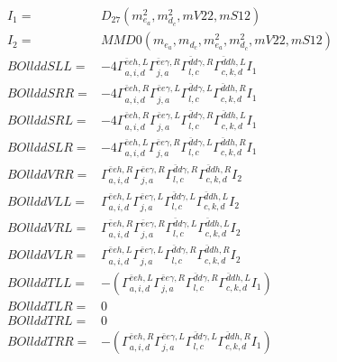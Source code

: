 \documentclass[A4,landscape]{article}
\begin{document}
\begin{align} 
I_1 = & D_{27}(m^2_{e_{{a}}}, m^2_{d_{{c}}}, mV22, mS12) \\ 
I_2 = & MMD0(m_{e_{{a}}}, m_{d_{{c}}}, m^2_{e_{{a}}}, m^2_{d_{{c}}}, mV22, mS12) \\ 
  BOllddSLL= & -4  \Gamma^{\bar{e}e h ,L}_{a, i, d} \Gamma^{\bar{e}e \gamma ,R}_{j, a} \Gamma^{\bar{d}d \gamma ,R}_{l, c} \Gamma^{\bar{d}d h ,L}_{c, k, d} I_1 \\ 
  BOllddSRR= & -4  \Gamma^{\bar{e}e h ,R}_{a, i, d} \Gamma^{\bar{e}e \gamma ,L}_{j, a} \Gamma^{\bar{d}d \gamma ,L}_{l, c} \Gamma^{\bar{d}d h ,R}_{c, k, d} I_1 \\ 
  BOllddSRL= & -4  \Gamma^{\bar{e}e h ,R}_{a, i, d} \Gamma^{\bar{e}e \gamma ,L}_{j, a} \Gamma^{\bar{d}d \gamma ,R}_{l, c} \Gamma^{\bar{d}d h ,L}_{c, k, d} I_1 \\ 
  BOllddSLR= & -4  \Gamma^{\bar{e}e h ,L}_{a, i, d} \Gamma^{\bar{e}e \gamma ,R}_{j, a} \Gamma^{\bar{d}d \gamma ,L}_{l, c} \Gamma^{\bar{d}d h ,R}_{c, k, d} I_1 \\ 
  BOllddVRR= &  \Gamma^{\bar{e}e h ,R}_{a, i, d} \Gamma^{\bar{e}e \gamma ,R}_{j, a} \Gamma^{\bar{d}d \gamma ,R}_{l, c} \Gamma^{\bar{d}d h ,R}_{c, k, d} I_2 \\ 
  BOllddVLL= &  \Gamma^{\bar{e}e h ,L}_{a, i, d} \Gamma^{\bar{e}e \gamma ,L}_{j, a} \Gamma^{\bar{d}d \gamma ,L}_{l, c} \Gamma^{\bar{d}d h ,L}_{c, k, d} I_2 \\ 
  BOllddVRL= &  \Gamma^{\bar{e}e h ,R}_{a, i, d} \Gamma^{\bar{e}e \gamma ,R}_{j, a} \Gamma^{\bar{d}d \gamma ,L}_{l, c} \Gamma^{\bar{d}d h ,L}_{c, k, d} I_2 \\ 
  BOllddVLR= &  \Gamma^{\bar{e}e h ,L}_{a, i, d} \Gamma^{\bar{e}e \gamma ,L}_{j, a} \Gamma^{\bar{d}d \gamma ,R}_{l, c} \Gamma^{\bar{d}d h ,R}_{c, k, d} I_2 \\ 
  BOllddTLL= & -( \Gamma^{\bar{e}e h ,L}_{a, i, d} \Gamma^{\bar{e}e \gamma ,R}_{j, a} \Gamma^{\bar{d}d \gamma ,R}_{l, c} \Gamma^{\bar{d}d h ,L}_{c, k, d} I_1) \\ 
  BOllddTLR= & 0 \\ 
  BOllddTRL= & 0 \\ 
  BOllddTRR= & -( \Gamma^{\bar{e}e h ,R}_{a, i, d} \Gamma^{\bar{e}e \gamma ,L}_{j, a} \Gamma^{\bar{d}d \gamma ,L}_{l, c} \Gamma^{\bar{d}d h ,R}_{c, k, d} I_1) \\ 
\end{align} 
\end{document}
